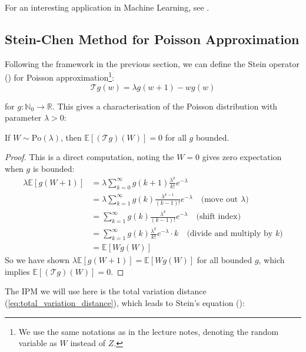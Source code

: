 \documentclass{article}
\begin{document}
\begin{unexaminable}
    For an interesting application in Machine Learning, see \citep{pmlr-v119-grathwohl20a}.
\end{unexaminable}


\subsection{Stein-Chen Method for Poisson Approximation}  
Following the framework in the previous section, we can define the Stein operator () for Poisson approximation\footnote{We use the same notations as in the lecture notes, denoting the random variable as $W$ instead of $Z$.}:
\begin{equation}
    \mathcal{T}g(w) = \lambda g(w+1) - wg(w)
\end{equation}

for $g: \mathbb{N}_0 \to \mathbb{R}$. This gives a characterisation of the Poisson distribution with parameter $\lambda>0$:

\begin{proposition}
    \label{prop: direction1 poisson}
    If $W\sim \text{Po}(\lambda)$, then $\mathbb{E}[(\mathcal{T}g)(W)]=0$ for all $g$ bounded.
\end{proposition}

\begin{proof}
This is a direct computation, noting the $W=0$ gives zero expectation when $g$ is bounded:  
    \begin{align*}
        \lambda \mathbb{E}[g(W+1)] &= \lambda \sum_{k=0}^\infty g(k+1) \frac{\lambda^k}{k!} e^{-\lambda}\\
        &= \lambda \sum_{k=1}^\infty g(k) \frac{\lambda^{k-1}}{(k-1)!} e^{-\lambda} \quad \text{(move out $\lambda$)}\\
        &= \sum_{k=1}^\infty g(k) \frac{\lambda^k}{(k-1)!} e^{-\lambda} \quad \text{(shift index)}
        \\
        &= \sum_{k=1}^\infty g(k) \frac{\lambda^k}{k!} e^{-\lambda} \cdot k \quad \text{(divide and multiply by $k$)}\\
        &= \mathbb{E}[Wg(W)]
    \end{align*}
So we have shown $\lambda\mathbb{E}[g(W+1)] = \mathbb{E}[Wg(W)]$ for all bounded $g$, which implies $\mathbb{E}[(\mathcal{T}g)(W)]=0$.  
\end{proof}


The IPM we will use here is the total variation distance (\ref{eq:total_variation_distance}), which leads to Stein's equation ():
\end{document}
